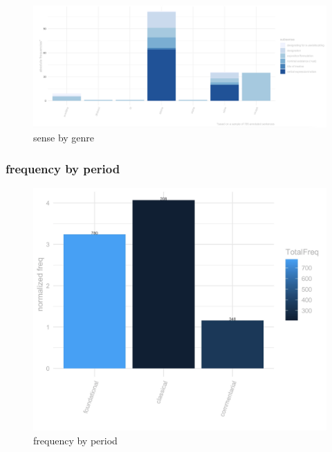 \documentclass[
  letterpaper,
  DIV=11,
  numbers=noendperiod,
  oneside]{scrreprt}
\begin{document}
\begin{figure}

{\centering \includegraphics{./www/SenseByGenre_prajJapti.png}

}

\caption{\label{fig-sensebygenre}sense by genre}

\end{figure}

\hypertarget{sec-freqbyperiod}{%
\subsubsection{frequency by period}\label{sec-freqbyperiod}}

\begin{figure}

{\centering \includegraphics{./www/PeriodFreq_prajJapti.webp}

}

\caption{\label{fig-freqbyperiod}frequency by period}

\end{figure}
\end{document}
